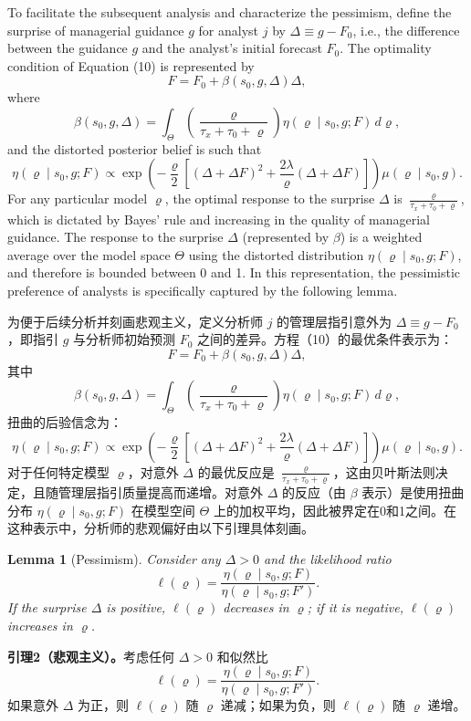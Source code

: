 \documentclass[12pt,a4paper]{article}
\newenvironment{original}
  {\par\medskip\noindent\ignorespaces}
  {\par\medskip}
\newenvironment{translation}
  {\par\noindent{\color{transblue}\ignorespaces}}
  {\par\bigskip}
\newtheorem{lemma}[theorem]{Lemma}
\begin{document}
\begin{original}
To facilitate the subsequent analysis and characterize the pessimism, define the surprise of managerial guidance $g$ for analyst $j$ by $\Delta \equiv g - F_0$, i.e., the difference between the guidance $g$ and the analyst's initial forecast $F_0$. The optimality condition of Equation (10) is represented by
\[
F = F_0 + \beta(s_0, g, \Delta) \Delta, \tag{12}
\]
where
\[
\beta(s_0, g, \Delta) = \int_{\Theta} \left( \frac{\varrho}{\tau_x + \tau_0 + \varrho} \right) \eta(\varrho \mid s_0, g; F) \, d\varrho, \tag{13}
\]
and the distorted posterior belief is such that
\[
\eta(\varrho \mid s_0, g; F) \propto \exp\!\left( -\frac{\varrho}{2}\left[ (\Delta + \Delta F)^2 + \frac{2\lambda}{\varrho}(\Delta + \Delta F) \right] \right) \mu(\varrho \mid s_0, g). \tag{14}
\]
For any particular model $\varrho$, the optimal response to the surprise $\Delta$ is $\frac{\varrho}{\tau_x + \tau_0 + \varrho}$, which is dictated by Bayes' rule and increasing in the quality of managerial guidance. The response to the surprise $\Delta$ (represented by $\beta$) is a weighted average over the model space $\Theta$ using the distorted distribution $\eta(\varrho \mid s_0, g; F)$, and therefore is bounded between 0 and 1. In this representation, the pessimistic preference of analysts is specifically captured by the following lemma.
\end{original}
\begin{translation}
为便于后续分析并刻画悲观主义，定义分析师 $j$ 的管理层指引意外为 $\Delta \equiv g - F_0$，即指引 $g$ 与分析师初始预测 $F_0$ 之间的差异。方程（10）的最优条件表示为：
\[
F = F_0 + \beta(s_0, g, \Delta) \Delta, \tag{12}
\]
其中
\[
\beta(s_0, g, \Delta) = \int_{\Theta} \left( \frac{\varrho}{\tau_x + \tau_0 + \varrho} \right) \eta(\varrho \mid s_0, g; F) \, d\varrho, \tag{13}
\]
扭曲的后验信念为：
\[
\eta(\varrho \mid s_0, g; F) \propto \exp\!\left( -\frac{\varrho}{2}\left[ (\Delta + \Delta F)^2 + \frac{2\lambda}{\varrho}(\Delta + \Delta F) \right] \right) \mu(\varrho \mid s_0, g). \tag{14}
\]
对于任何特定模型 $\varrho$，对意外 $\Delta$ 的最优反应是 $\frac{\varrho}{\tau_x + \tau_0 + \varrho}$，这由贝叶斯法则决定，且随管理层指引质量提高而递增。对意外 $\Delta$ 的反应（由 $\beta$ 表示）是使用扭曲分布 $\eta(\varrho \mid s_0, g; F)$ 在模型空间 $\Theta$ 上的加权平均，因此被界定在0和1之间。在这种表示中，分析师的悲观偏好由以下引理具体刻画。
\end{translation}

\begin{lemma}[Pessimism]
Consider any $\Delta > 0$ and the likelihood ratio
\[
\ell(\varrho) = \frac{\eta(\varrho \mid s_0, g; F)}{\eta(\varrho \mid s_0, g; F')}.
\]
If the surprise $\Delta$ is positive, $\ell(\varrho)$ decreases in $\varrho$; if it is negative, $\ell(\varrho)$ increases in $\varrho$.
\end{lemma}
\begin{translation}
\textbf{引理2（悲观主义）。}考虑任何 $\Delta > 0$ 和似然比
\[
\ell(\varrho) = \frac{\eta(\varrho \mid s_0, g; F)}{\eta(\varrho \mid s_0, g; F')}.
\]
如果意外 $\Delta$ 为正，则 $\ell(\varrho)$ 随 $\varrho$ 递减；如果为负，则 $\ell(\varrho)$ 随 $\varrho$ 递增。
\end{translation}
\end{document}
